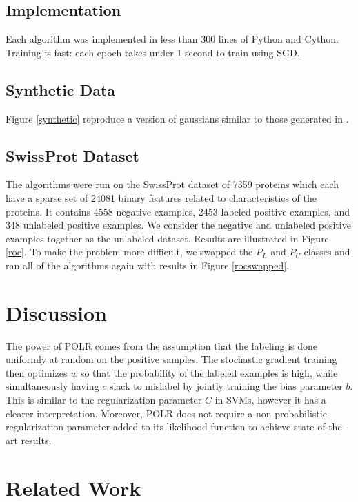\documentclass{article}
\begin{document}
\subsection{Implementation}

Each algorithm was implemented in less than 300 lines of Python and Cython. Training is fast: each epoch takes under 1 second to train using SGD.

\subsection{Synthetic Data}

Figure \ref{synthetic} reproduce a version of gaussians similar to those generated in \cite{elkan08}. 

\subsection{SwissProt Dataset}

The algorithms were run on the SwissProt \cite{elkan08} dataset of 7359 proteins which each have a sparse set of 24081 binary features related to characteristics of the proteins. It contains 4558 negative examples, 2453 labeled positive examples, and 348 unlabeled positive examples.   We consider the negative and unlabeled positive examples together as the unlabeled dataset. Results are illustrated in Figure \ref{roc}. To make the problem more difficult, we swapped the $P_L$ and $P_U$ classes and ran all of the algorithms again with results in Figure \ref{rocswapped}.

\section{Discussion}

The power of POLR comes from the assumption that the labeling is done uniformly at random on the positive samples.  The stochastic gradient training then optimizes $w$ so that the probability of the labeled examples is high, while simultaneously having $c$ slack to mislabel by jointly training the bias parameter $b$.  This is similar to the regularization parameter $C$ in SVMs, however it has a clearer interpretation.  Moreover, POLR does not require a non-probabilistic regularization parameter added to its likelihood function to achieve state-of-the-art results.

\section{Related Work}
\end{document}
